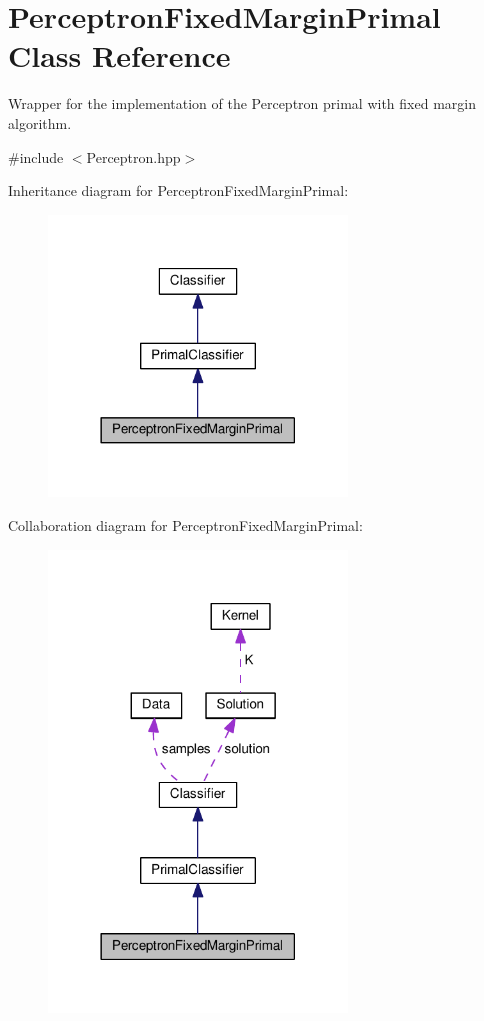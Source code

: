 \hypertarget{class_perceptron_fixed_margin_primal}{}\section{Perceptron\+Fixed\+Margin\+Primal Class Reference}
\label{class_perceptron_fixed_margin_primal}


Wrapper for the implementation of the Perceptron primal with fixed margin algorithm.  




{\ttfamily \#include $<$Perceptron.\+hpp$>$}



Inheritance diagram for Perceptron\+Fixed\+Margin\+Primal\+:\nopagebreak
\begin{figure}[H]
\begin{center}
\leavevmode
\includegraphics[width=225pt]{class_perceptron_fixed_margin_primal__inherit__graph}
\end{center}
\end{figure}


Collaboration diagram for Perceptron\+Fixed\+Margin\+Primal\+:\nopagebreak
\begin{figure}[H]
\begin{center}
\leavevmode
\includegraphics[width=225pt]{class_perceptron_fixed_margin_primal__coll__graph}
\end{center}
\end{figure}
